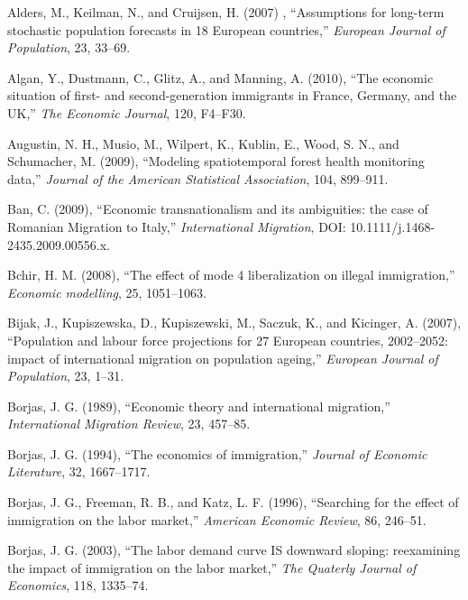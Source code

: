 \documentclass[10pt] {article}
\theoremstyle{definition}
\theoremstyle{plain}
\begin{document}
\begin{thebibliography}{99}

\bibitem{} Alders, M., Keilman, N., and Cruijsen, H. (2007) , ``Assumptions for long-term stochastic population forecasts in 18 European countries,'' \textit{European Journal of Population}, 23, 33--69.

\bibitem{} Algan, Y., Dustmann, C., Glitz, A., and Manning, A. (2010), ``The economic situation of first- and second-generation immigrants in France, Germany, and the UK,'' \textit{The Economic Journal}, 120, F4--F30.

\bibitem{} Augustin, N. H., Musio, M., Wilpert, K., Kublin, E., Wood, S. N., and Schumacher, M. (2009), ``Modeling spatiotemporal forest health monitoring data,'' \textit{Journal of the American Statistical Association}, 104, 899--911.

\bibitem{} Ban, C. (2009), ``Economic transnationalism and its ambiguities: the case of Romanian Migration to Italy,'' \textit{International Migration}, DOI: 10.1111/j.1468-2435.2009.00556.x.


\bibitem{} Bchir, H. M. (2008), ``The effect of mode 4 liberalization on illegal immigration,'' \textit{Economic modelling}, 25, 1051--1063.

\bibitem{} Bijak, J., Kupiszewska, D., Kupiszewski, M., Saczuk, K., and Kicinger, A. (2007), ``Population and labour force projections for 27 European countries, 2002--2052: impact of international migration on population ageing,'' \textit{European Journal of Population}, 23, 1--31.

\bibitem{} Borjas, J. G. (1989), ``Economic theory and international migration,'' \textit{International Migration Review}, 23, 457--85.

\bibitem{} Borjas, J. G. (1994), ``The economics of immigration,'' \textit{Journal of Economic Literature}, 32, 1667--1717.

\bibitem{} Borjas, J. G., Freeman, R. B., and Katz, L. F. (1996), ``Searching for the effect of immigration on the labor market,'' \textit{American Economic Review}, 86, 246--51.

\bibitem{} Borjas, J. G. (2003), ``The labor demand curve IS downward sloping: reexamining the impact of immigration on the labor market,'' \textit{The Quaterly Journal of Economics}, 118, 1335--74.


\end{thebibliography}
\end{document}

